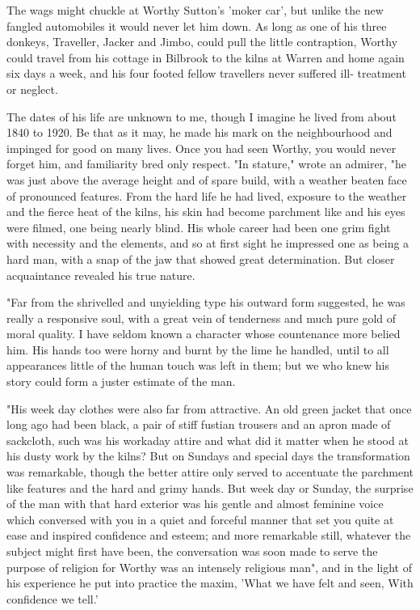 
The wags might chuckle at Worthy Sutton's 'moker car', but unlike the new fangled automobiles it would never let him down. As long as one of his three donkeys, Traveller, Jacker and Jimbo, could pull the little contraption, Worthy could travel from his cottage in Bilbrook to the kilns at Warren and home again six days a week, and his four footed fellow travellers never suffered ill- treatment or neglect.

The dates of his life are unknown to me, though I imagine he lived from about 1840 to 1920. Be that as it may, he made his mark on the neighbourhood and impinged for good on many lives. Once you had seen Worthy, you would never forget him, and familiarity bred only respect. "In stature," wrote an admirer, "he was just above the average height and of spare build, with a weather beaten face of pronounced features. From the hard life he had lived, exposure to the weather and the fierce heat of the kilns, his skin had become parchment like and his eyes were filmed, one being nearly blind. His whole career had been one grim fight with necessity and the elements, and so at first sight he impressed one as being a hard man, with a snap of the jaw that showed great determination. But closer acquaintance revealed his true nature.

"Far from the shrivelled and unyielding type his outward form suggested, he was really a responsive soul, with a great vein of tenderness and much pure gold of moral quality. I have seldom known a character whose countenance more belied him. His hands too were horny and burnt by the lime he handled, until to all appearances little of the human touch was left in them; but we who knew his story could form a juster estimate of the man.

"His week day clothes were also far from attractive. An old green jacket that once long ago had been black, a pair of stiff fustian trousers and an apron made of sackcloth, such was his workaday attire   and what did it matter when he stood at his dusty work by the kilns? But on Sundays and special days the transformation was remarkable, though the better attire only served to accentuate the parchment like features and the hard and grimy hands. But week day or Sunday, the surprise of the man with that hard exterior was his gentle and almost feminine voice which conversed with you in a quiet and forceful manner that set you quite at ease and inspired confidence and esteem; and more remarkable still, whatever the subject might first have been, the conversation was soon made to serve the purpose of religion   for Worthy was an intensely religious man", and in the light of his experience he put into practice the maxim, 'What we have felt and seen, With confidence we tell.'

